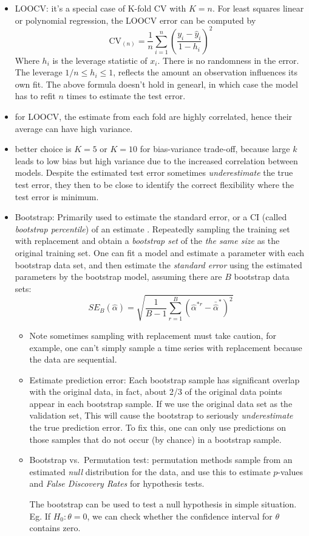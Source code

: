 \documentclass[
  letterpaper,
  DIV=11,
  numbers=noendperiod]{scrreprt}
\begin{document}
\begin{itemize}
\item
  LOOCV: it's a special case of K-fold CV with \(K=n\). For least
  squares linear or polynomial regression, the LOOCV error can be
  computed by \[
  \text{CV}_{(n)}=\frac{1}{n}\sum_{i=1}^n \left(\frac{y_i-\hat{y}_i}{1-h_i} \right)^2
  \] Where \(h_i\) is the leverage statistic of \(x_i\). There is no
  randomness in the error. The leverage \(1/n\le h_i\le 1\), reflects
  the amount an observation influences its own fit. The above formula
  doesn't hold in genearl, in which case the model has to refit \(n\)
  times to estimate the test error.
\item
  for LOOCV, the estimate from each fold are highly correlated, hence
  their average can have high variance.
\item
  better choice is \(K=5\) or \(K=10\) for bias-variance trade-off,
  because large \(k\) leads to low bias but high variance due to the
  increased correlation between models. Despite the estimated test error
  sometimes \emph{underestimate} the true test error, they then to be
  close to identify the correct flexibility where the test error is
  minimum.
\item
  Bootstrap: Primarily used to estimate the standard error, or a CI
  (called \emph{bootstrap percentile}) of an estimate . Repeatedly
  sampling the training set with replacement and obtain a
  \emph{bootstrap set} of the \emph{the same size} as the original
  training set. One can fit a model and estimate a parameter with each
  bootstrap data set, and then estimate the \emph{standard error} using
  the estimated parameters by the bootstrap model, assuming there are
  \(B\) bootstrap data sets: \[
  SE_B(\hat{\alpha})=\sqrt{\frac{1}{B-1}\sum_{r=1}^B (\hat{\alpha}^{*r}-\bar{\hat{\alpha}}^*)^2   }
  \]

  \begin{itemize}
  \item
    Note sometimes sampling with replacement must take caution, for
    example, one can't simply sample a time series with replacement
    because the data are sequential.
  \item
    Estimate prediction error: Each bootstrap sample has significant
    overlap with the original data, in fact, about 2/3 of the original
    data points appear in each bootstrap sample. If we use the original
    data set as the validation set, This will cause the bootstrap to
    seriously \emph{underestimate} the true prediction error. To fix
    this, one can only use predictions on those samples that do not
    occur (by chance) in a bootstrap sample.
  \item
    Bootstrap vs.~Permutation test: permutation methods sample from an
    estimated \emph{null} distribution for the data, and use this to
    estimate \(p\)-values and \emph{False Discovery Rates} for
    hypothesis tests.

    The bootstrap can be used to test a null hypothesis in simple
    situation. Eg. If \(H_0: \theta=0\), we can check whether the
    confidence interval for \(\theta\) contains zero.
  \end{itemize}
\end{itemize}
\end{document}
